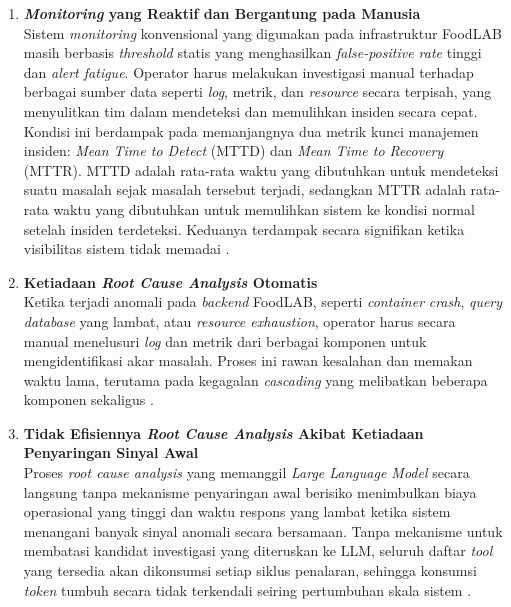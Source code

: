 \begin{enumerate}[label=\arabic*., leftmargin=*]
  \item \textbf{\textit{Monitoring} yang Reaktif dan Bergantung pada Manusia}\\
        Sistem \textit{monitoring} konvensional yang digunakan pada infrastruktur FoodLAB masih berbasis \textit{threshold} statis yang menghasilkan \textit{false-positive rate} tinggi dan \textit{alert fatigue}. Operator harus melakukan investigasi manual terhadap berbagai sumber data seperti \textit{log}, metrik, dan \textit{resource} secara terpisah, yang menyulitkan tim dalam mendeteksi dan memulihkan insiden secara cepat. Kondisi ini berdampak pada memanjangnya dua metrik kunci manajemen insiden: \textit{Mean Time to Detect} (MTTD) dan \textit{Mean Time to Recovery} (MTTR). MTTD adalah rata-rata waktu yang dibutuhkan untuk mendeteksi suatu masalah sejak masalah tersebut terjadi, sedangkan MTTR adalah rata-rata waktu yang dibutuhkan untuk memulihkan sistem ke kondisi normal setelah insiden terdeteksi. Keduanya terdampak secara signifikan ketika visibilitas sistem tidak memadai \cite{voutsas2024mitigating}.

  \item \textbf{Ketiadaan \textit{Root Cause Analysis} Otomatis}\\
        Ketika terjadi anomali pada \textit{backend} FoodLAB, seperti \textit{container} \textit{crash}, \textit{query} \textit{database} yang lambat, atau \textit{resource exhaustion}, operator harus secara manual menelusuri \textit{log} dan metrik dari berbagai komponen untuk mengidentifikasi akar masalah. Proses ini rawan kesalahan dan memakan waktu lama, terutama pada kegagalan \textit{cascading} yang melibatkan beberapa komponen sekaligus \cite{trinity2023}.

  \item \textbf{Tidak Efisiennya \textit{Root Cause Analysis} Akibat Ketiadaan Penyaringan Sinyal Awal}\\
        Proses \textit{root cause analysis} yang memanggil \textit{Large Language Model} secara langsung tanpa mekanisme penyaringan awal berisiko menimbulkan biaya operasional yang tinggi dan waktu respons yang lambat ketika sistem menangani banyak sinyal anomali secara bersamaan. Tanpa mekanisme untuk membatasi kandidat investigasi yang diteruskan ke LLM, seluruh daftar \textit{tool} yang tersedia akan dikonsumsi setiap siklus penalaran, sehingga konsumsi \textit{token} tumbuh secara tidak terkendali seiring pertumbuhan skala sistem \cite{voutsas2024mitigating}.


\end{enumerate}
